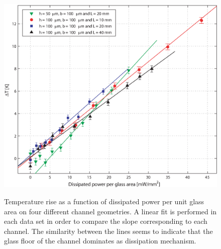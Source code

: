 \documentclass[twocolumn]{svjour3}       %
\begin{document}
\begin{figure}[h!]
\centering
\includegraphics[width=\columnwidth]{figs/rectas.eps}
\label{fig:rectas}
\caption{Temperature rise as a function of dissipated power per unit glass area on four different channel geometries. A linear fit is performed in each data set in order to compare the slope corresponding to each channel. The similarity between the lines seems to indicate that the glass floor of the channel dominates as dissipation mechanism.}
\end{figure}




\end{document}
